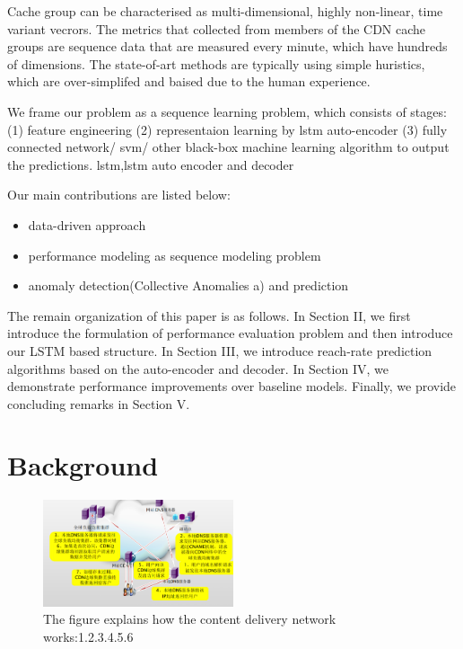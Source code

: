 \documentclass[5p]{elsarticle}
\begin{document}
Cache group can be characterised as multi-dimensional, highly non-linear, time variant vecrors. The metrics that collected from members of the CDN cache groups are sequence data that are measured every minute, which have hundreds of dimensions. The state-of-art methods are typically using simple huristics, which are over-simplifed and baised due to the human experience. 

We frame our problem as a sequence learning problem, which consists of stages: (1) feature engineering (2) representaion learning by lstm auto-encoder (3) fully connected network/ svm/ other black-box machine learning algorithm to output the predictions. 
lstm,lstm auto encoder and decoder

Our main contributions are listed below:
\begin{itemize}
  \item data-driven approach
  \item performance modeling as sequence modeling problem
  \item anomaly detection(Collective Anomalies a) and prediction
\end{itemize}

The remain organization of this paper is as follows. In Section II, we first  introduce the formulation of performance evaluation problem and  then introduce  our LSTM  based  structure. In Section III, we introduce reach-rate prediction algorithms based on the
auto-encoder and decoder. In Section IV, we demonstrate performance  improvements over baseline models. Finally, we provide concluding remarks in Section V.
\section{Background}
\begin{figure}[h]
    \centering
    \includegraphics[width=0.5\textwidth]{CDN.png}
    \caption{The figure explains how the content delivery network works:1.2.3.4.5.6}
    \label{fig}
\end{figure}
\end{document}
